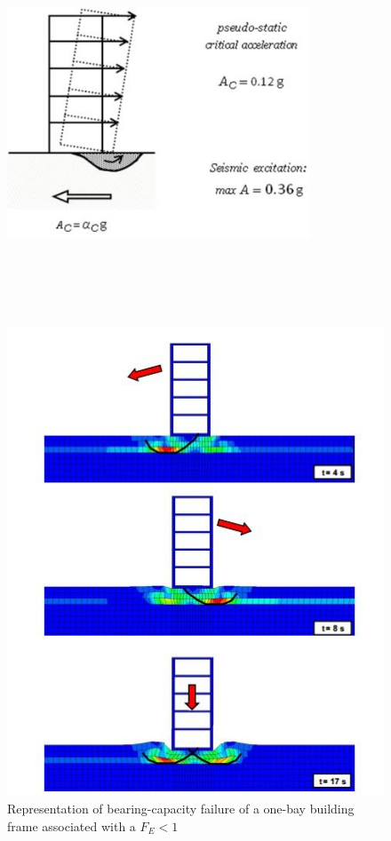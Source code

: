 \documentclass[11pt,a4paper]{report}
\begin{document}
   \begin{figure}[!h]
   	\centering
   	\begin{minipage}[b]{0.45\textwidth}
   		\includegraphics[width=9cm, height=12cm, keepaspectratio]{newmark5}
   		\caption{Representation of bearing-capacity failure of a one-bay building frame associated with a $F_E<1$}
   		\label{new5}
   	\end{minipage}
   	\hfill
   	\begin{minipage}[b]{0.45\textwidth}
   		\includegraphics[width=\textwidth]{newmark4}

\end{minipage}
\end{figure}
\end{document}
